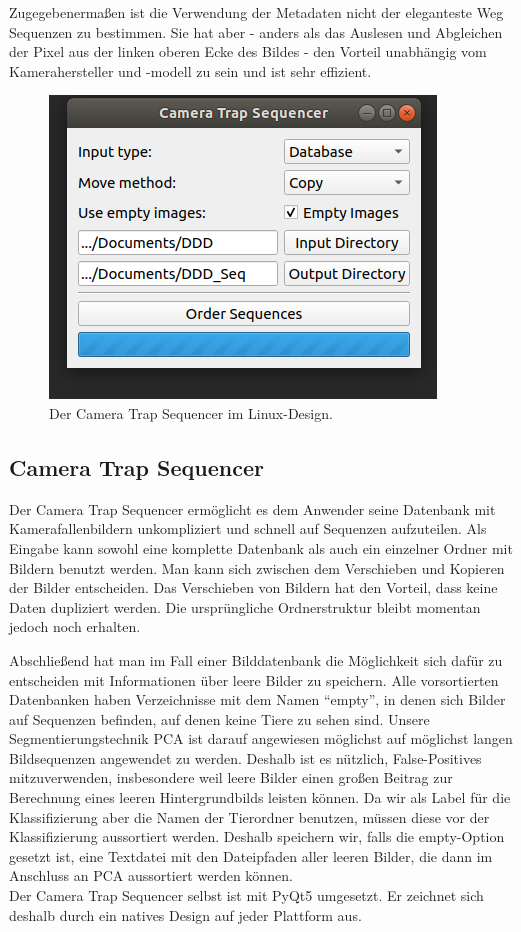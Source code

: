Zugegebenermaßen ist die Verwendung der Metadaten nicht der eleganteste Weg Sequenzen zu bestimmen. Sie hat aber - anders als das Auslesen und Abgleichen der Pixel aus der linken oberen Ecke des Bildes - den Vorteil unabhängig vom Kamerahersteller und -modell zu sein und ist sehr effizient.

\begin{figure}
	\centering
	\includegraphics[scale=0.5]{img/CameraTrapSequencer.png}
	\caption{Der Camera Trap Sequencer im Linux-Design.}
\end{figure}

\subsection{Camera Trap Sequencer}

Der Camera Trap Sequencer ermöglicht es dem Anwender seine Datenbank mit Kamerafallenbildern unkompliziert und schnell auf Sequenzen aufzuteilen. Als Eingabe kann sowohl eine komplette Datenbank als auch ein einzelner Ordner mit Bildern benutzt werden. Man kann sich zwischen dem Verschieben und Kopieren der Bilder entscheiden. Das Verschieben von Bildern hat den Vorteil, dass keine Daten dupliziert werden. Die ursprüngliche Ordnerstruktur bleibt momentan jedoch noch erhalten. 

Abschließend hat man im Fall einer Bilddatenbank die Möglichkeit sich dafür zu entscheiden mit Informationen über leere Bilder zu speichern. Alle vorsortierten Datenbanken haben Verzeichnisse mit dem Namen \enquote{empty}, in denen sich Bilder auf Sequenzen befinden, auf denen keine Tiere zu sehen sind. Unsere Segmentierungstechnik PCA ist darauf angewiesen möglichst auf möglichst langen Bildsequenzen angewendet zu werden. Deshalb ist es nützlich, False-Positives mitzuverwenden, insbesondere weil leere Bilder einen großen Beitrag zur Berechnung eines leeren Hintergrundbilds leisten können. Da wir als Label für die Klassifizierung aber die Namen der Tierordner benutzen, müssen diese vor der Klassifizierung aussortiert werden. Deshalb speichern wir, falls die empty-Option gesetzt ist, eine Textdatei mit den Dateipfaden aller leeren Bilder, die dann im Anschluss an PCA aussortiert werden können. \\
Der Camera Trap Sequencer selbst ist mit PyQt5 umgesetzt. Er zeichnet sich deshalb durch ein natives Design auf jeder Plattform aus.
